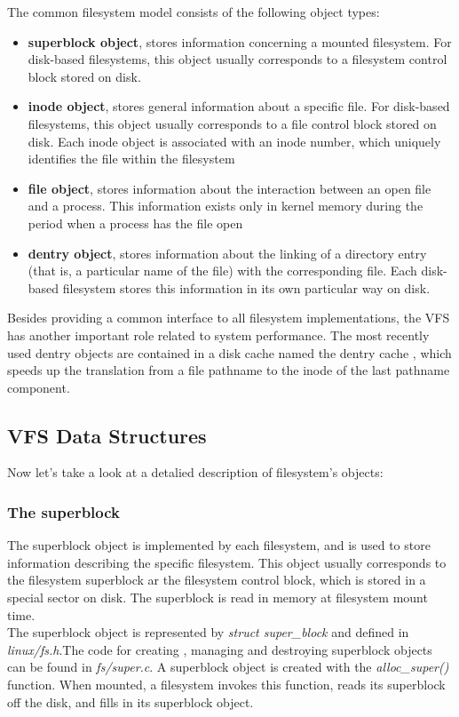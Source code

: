 \documentclass[conference]{IEEEtran}
\begin{document}
The common filesystem model consists of the following object types:
\begin{itemize}
\item
{\bf superblock object}, stores information concerning a mounted filesystem. For disk-based filesystems, 
this object usually corresponds to a filesystem control block stored on disk.
\item
{\bf inode object}, stores general information about a specific file. For disk-based filesystems, this object usually corresponds to a file control block stored on disk. 
Each inode object is associated with an inode number, which uniquely identifies the file within the filesystem
\item
{\bf file object}, stores information about the interaction between an open file and a process. This information 
exists only in kernel memory during the period when a process has the file open
\item 
{\bf dentry object}, stores information about the linking of a directory entry (that is, a particular name of the file) with the 
corresponding file. Each disk-based filesystem stores this information in its own particular way on disk.
\end{itemize}
Besides providing a common interface to all filesystem implementations, the VFS has another important role 
related to system performance. The most recently used dentry objects are contained in a disk cache named the 
dentry cache , which speeds up the translation from a file pathname to the inode of the last pathname component.
\subsection{VFS Data Structures}
Now let's take a look at a detalied description of filesystem's objects:
\subsubsection {The superblock} 
The superblock object is implemented by each filesystem, and is used to store information describing the 
specific filesystem. This object usually corresponds to the filesystem superblock ar the filesystem control 
block, which is stored in a special sector on disk. The superblock is read in memory at filesystem
mount time. \\

The superblock object is represented by {\em struct super\_block } and defined in {\em linux/fs.h}.The code for 
creating , managing and destroying superblock objects can be found in {\em fs/super.c}. A superblock
object is created with the {\em alloc\_super() } function. When mounted, a filesystem invokes this function,
reads its superblock off the disk, and fills in its superblock object. \\
\end{document}
